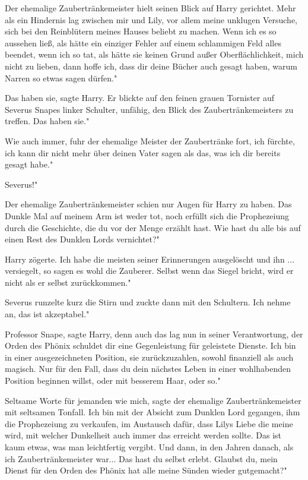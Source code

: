 Der ehemalige Zaubertränkemeister hielt seinen Blick auf Harry gerichtet. \glqq
Mehr als ein Hindernis lag zwischen mir und Lily, vor allem meine unklugen
Versuche, sich bei den Reinblütern meines Hauses beliebt zu machen. Wenn ich es
so aussehen ließ, als hätte ein einziger Fehler auf einem schlammigen Feld alles
beendet, wenn ich so tat, als hätte sie keinen Grund außer Oberflächlichkeit,
mich nicht zu lieben, dann hoffe ich, dass dir deine Bücher auch gesagt haben,
warum Narren so etwas sagen dürfen."

\glqq{}Das haben sie\grqq{}, sagte Harry. Er blickte auf den feinen grauen
Tornister auf Severus Snapes linker Schulter, unfähig, den Blick des
Zaubertränkemeisters zu treffen. \glqq{}Das haben sie."

\glqq{}Wie auch immer\grqq{}, fuhr der ehemalige Meister der Zaubertränke fort,
\glqq{}ich fürchte, ich kann dir nicht mehr über deinen Vater sagen als das, was
ich dir bereits gesagt habe."

\glqq{}Severus!"

Der ehemalige Zaubertränkemeister schien nur Augen für Harry zu haben. \glqq{}Das
Dunkle Mal auf meinem Arm ist weder tot, noch erfüllt sich die Prophezeiung
durch die Geschichte, die du vor der Menge erzählt hast. Wie hast du alle bis
auf einen Rest des Dunklen Lords vernichtet?"

Harry zögerte. \glqq{}Ich habe die meisten seiner Erinnerungen ausgelöscht und
ihn ... versiegelt, so sagen es wohl die Zauberer. Selbst wenn das Siegel
bricht, wird er nicht als er selbst zurückkommen."

Severus runzelte kurz die Stirn und zuckte dann mit den Schultern. \glqq{}Ich
nehme an, das ist akzeptabel."

\glqq{}Professor Snape\grqq{}, sagte Harry, denn auch das lag nun in seiner
Verantwortung, \glqq{}der Orden des Phönix schuldet dir eine Gegenleistung für
geleistete Dienste. Ich bin in einer ausgezeichneten Position, sie
zurückzuzahlen, sowohl finanziell als auch magisch. Nur für den Fall, dass du
dein nächstes Leben in einer wohlhabenden Position beginnen willst, oder mit
besserem Haar, oder so."

\glqq{}Seltsame Worte für jemanden wie mich\grqq{}, sagte der ehemalige
Zaubertränkemeister mit seltsamen Tonfall. \glqq{}Ich bin mit der Absicht zum
Dunklen Lord gegangen, ihm die Prophezeiung zu verkaufen, im Austausch dafür,
dass Lilys Liebe die meine wird, mit welcher Dunkelheit auch immer das erreicht
werden sollte. Das ist kaum etwas, was man leichtfertig vergibt. Und dann, in
den Jahren danach, als ich Zaubertränkemeister war... Das hast du selbst erlebt.
Glaubst du, mein Dienst für den Orden des Phönix hat alle meine Sünden wieder
gutgemacht?"

